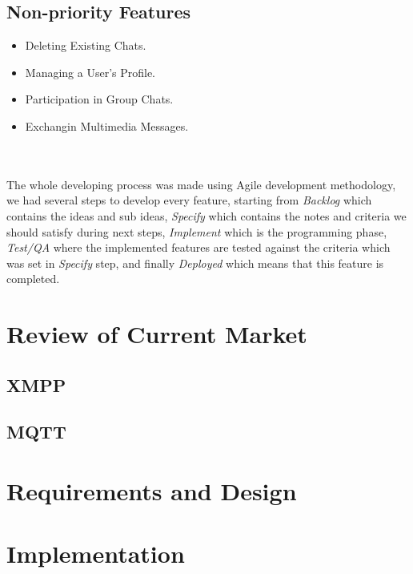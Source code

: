 \documentclass[11pt,a4paper]{report}
\begin{document}
\section{Non-priority Features}
	\begin{itemize}
		\item Deleting Existing Chats.
		\item Managing a User's Profile.
		\item Participation in Group Chats.
		\item Exchangin Multimedia Messages.
\end{itemize}
\\ \\
The whole developing process was made using Agile development methodology, we had several steps to develop every feature, starting from \emph {Backlog} which contains the ideas and sub ideas, \emph {Specify} which contains the notes and criteria we should satisfy during next steps, \emph {Implement} which is the programming phase, \emph {Test/QA} where the implemented features are tested against the criteria which was set in \emph {Specify} step, and finally \emph {Deployed} which means that this feature is completed.



\chapter{Review of Current Market}


\section{XMPP}

\section{MQTT}

\chapter{Requirements and Design}


\chapter{Implementation}
\end{document}
